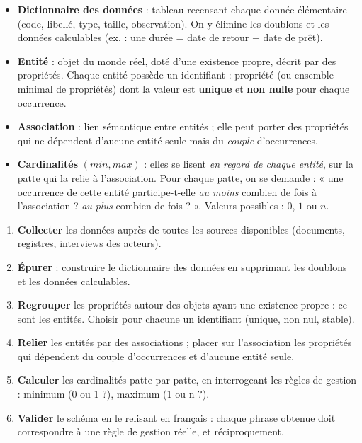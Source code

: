 \documentclass[11pt]{article}
\newcommand{\cle}[1]{{\popxbold\color{popdark}#1}}
\begin{document}
\begin{aretenir}
\begin{itemize}
\item \textbf{Dictionnaire des données} : tableau recensant chaque donnée élémentaire (code, libellé, type, taille, observation). On y élimine les \cle{doublons} et les \cle{données calculables} (ex. : une durée = date de retour $-$ date de prêt).
\item \textbf{Entité} : objet du monde réel, doté d'une existence propre, décrit par des \cle{propriétés}. Chaque entité possède un \cle{identifiant} : propriété (ou ensemble minimal de propriétés) dont la valeur est \textbf{unique} et \textbf{non nulle} pour chaque occurrence.
\item \textbf{Association} : lien sémantique entre entités ; elle peut porter des propriétés qui ne dépendent d'aucune entité seule mais du \emph{couple} d'occurrences.
\item \textbf{Cardinalités} $(min, max)$ : elles se lisent \emph{en regard de chaque entité}, sur la patte qui la relie à l'association. Pour chaque patte, on se demande : « une occurrence de cette entité participe-t-elle \emph{au moins} combien de fois à l'association ? \emph{au plus} combien de fois ? ». Valeurs possibles : $0$, $1$ ou $n$.
\end{itemize}
\end{aretenir}

\begin{methode}
\begin{enumerate}
\item \textbf{Collecter} les données auprès de toutes les sources disponibles (documents, registres, interviews des acteurs).
\item \textbf{Épurer} : construire le dictionnaire des données en supprimant les doublons et les données calculables.
\item \textbf{Regrouper} les propriétés autour des objets ayant une existence propre : ce sont les entités. Choisir pour chacune un identifiant (unique, non nul, stable).
\item \textbf{Relier} les entités par des associations ; placer sur l'association les propriétés qui dépendent du couple d'occurrences et d'aucune entité seule.
\item \textbf{Calculer} les cardinalités patte par patte, en interrogeant les règles de gestion : minimum (0 ou 1 ?), maximum (1 ou n ?).
\item \textbf{Valider} le schéma en le relisant en français : chaque phrase obtenue doit correspondre à une règle de gestion réelle, et réciproquement.
\end{enumerate}
\end{methode}
\end{document}
